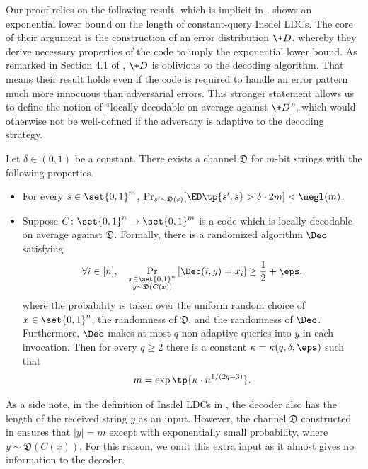 Our proof relies on the following result, which is implicit in \cite{blocki2021exponential}. \cite{blocki2021exponential} shows an exponential lower bound on the length of constant-query Insdel LDCs. The core of their argument is the construction of an error distribution $\+D$, whereby they derive necessary properties of the code to imply the exponential lower bound. As remarked in Section 4.1 of \cite{blocki2021exponential}, $\+D$ is oblivious to the decoding algorithm. That means their result holds even if the code is required to handle an error pattern much more innocuous than adversarial errors. This stronger statement allows us to define the notion of ``locally decodable on average against $\+D$'', which would otherwise not be well-defined if the adversary is adaptive to the decoding strategy. 
\begin{theorem}\label{thm:lb-channel}
Let $\delta \in (0,1)$ be a constant. There exists a channel $\mathfrak{D}$ for $m$-bit strings with the following properties.
\begin{itemize}
\item For every $s \in \set{0,1}^m$, $\Pr_{s'\sim \mathfrak{D}(s)}[\ED\tp{s', s} > \delta\cdot 2m] < \negl(m)$.
\item Suppose $C \colon \set{0,1}^n \rightarrow \set{0,1}^m$ is a code which is locally decodable on average against $\mathfrak{D}$. Formally, there is a randomized algorithm $\Dec$ satisfying
\begin{align*}
	\forall i \in [n], \quad \Pr_{\substack{x \in \set{0,1}^n \\ y \sim \mathfrak{D}(C(x))}}\left[ \Dec(i, y) = x_i \right] \ge \frac{1}{2} + \eps,
\end{align*} 
where the probability is taken over the uniform random choice of $x \in \set{0,1}^n$, the randomness of $\mathfrak{D}$, and the randomness of $\Dec$. Furthermore, $\Dec$ makes at most $q$ non-adaptive queries into $y$ in each invocation. Then for every $q\ge 2$ there is a constant $\kappa = \kappa(q,\delta,\eps)$ such that
\begin{align*}
m = \exp\tp{\kappa \cdot n^{1/(2q-3)}}.
\end{align*}
\end{itemize}
\end{theorem}

As a side note, in the definition of Insdel LDCs in \cite{blocki2021exponential}, the decoder also has the length of the received string $y$ as an input. However, the channel $\mathfrak{D}$ constructed in \cite{blocki2021exponential} ensures that $|y|=m$ except with exponentially small probability, where $y \sim \mathfrak{D}(C(x))$. For this reason, we omit this extra input as it almost gives no information to the decoder.

